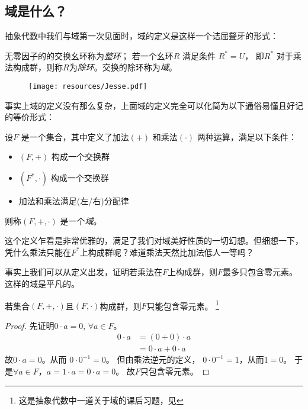 \subsection{域是什么？}

抽象代数中我们与域第一次见面时，域的定义是这样一个诘屈聱牙的形式：
\begin{definition}
    无零因子的的交换幺环称为\emph{整环}； 若一个幺环\(R\) 满足条件 \(R^{*}=U\)，
    即\(R^{*}\) 对于乘法构成群，则称\(R\)为\emph{除环}。交换的除环称为\emph{域}。
\end{definition}

\begin{figure}[H]
    \centering
    \texttt{[image: resources/Jesse.pdf]}
\end{figure}
事实上域的定义没有那么复杂，上面域的定义完全可以化简为以下通俗易懂且好记的等价形式：
\begin{definition}
    设\(F\) 是一个集合，其中定义了加法\((+)\) 和乘法\((\cdot)\) 两种运算，满足以下条件：
    \begin{itemize}
        \item \((F, +)\) 构成一个交换群
        \item \((F^{*}, \cdot)\) 构成一个交换群
        \item 加法和乘法满足(左/右)分配律
    \end{itemize}
    则称\((F, +, \cdot)\) 是一个\emph{域}。
\end{definition}

这个定义乍看是非常优雅的，满足了我们对域美好性质的一切幻想。但细想一下，
凭什么乘法只能在\(F^{*}\)上构成群呢？难道乘法天然比加法低人一等吗？

事实上我们可以从定义出发，证明若乘法在\(F\)上构成群，则\(F\)最多只包含零元素。这样的域是平凡的。

\begin{theorem}
    若集合\((F, + ,\cdot)\)且\((F,\cdot)\)构成群，则\(F\)只能包含零元素。
    \footnote{这是抽象代数中一道关于域的课后习题，见}
\end{theorem}
\begin{proof}
    先证明\(0 \cdot a=0\), \(\forall a \in F\)。
    \begin{align*}
        0 \cdot a &= (0+0) \cdot a\\
        &= 0 \cdot a + 0 \cdot a
    \end{align*}
    故\(0 \cdot a=0\)。从而 \(0\cdot 0^{-1}=0\)。
    但由乘法逆元的定义， \(0 \cdot 0^{-1}=1\)，从而\(1=0\)。
    于是\(\forall a \in F\)，\(a=1 \cdot a=0 \cdot a=0\)。
    故\(F\)只包含零元素。
\end{proof}

